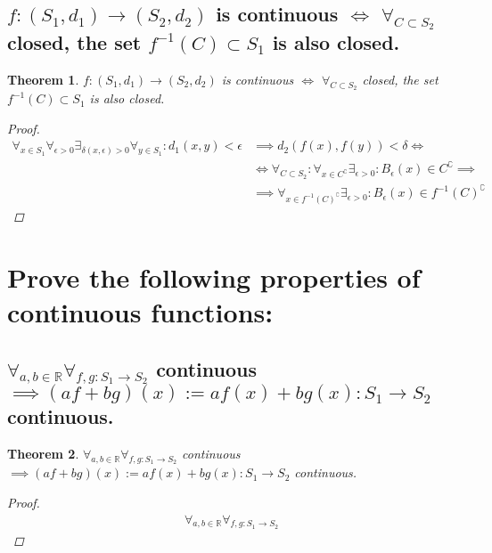 \documentclass[]{article}
\newcommand{\R}{\mathbb{R}}
\newtheorem{theorem}{Theorem}
\begin{document}
\subsection{$f: (S_1,d_1) \to (S_2,d_2)$ is continuous $\iff$ $\forall_{C \subset S_2}$ closed, the set $f^{-1} (C) \subset S_1$ is also closed.}
\begin{theorem}
    $f: (S_1,d_1) \to (S_2,d_2)$ is continuous $\iff$ $\forall_{C \subset S_2}$ closed, the set $f^{-1} (C) \subset S_1$ is also closed.
    \begin{proof}
        \begin{align*}
            \forall_{x\in S_1} \forall_{\epsilon>0} \exists_{\delta(x,\epsilon)>0} \forall_{y\in S_1} : d_1(x,y) < \epsilon &\implies d_2(f(x),f(y)) < \delta \iff\\
            &\iff \forall_{C\subset S_2} : \forall_{x \in C^\complement} \exists_{\epsilon>0} : B_{\epsilon}(x) \in C^\complement \implies\\
            &\implies \forall_{x \in f^{-1}(C)^\complement} \exists_{\epsilon>0} : B_{\epsilon}(x) \in f^{-1}(C)^\complement
        \end{align*}
    \end{proof}
\end{theorem}













\newpage
\section{Prove the following properties of continuous functions:}

\subsection{$\forall_{a,b\in\R} \forall_{f,g : S_1 \to S_2}$ continuous $\implies (a f + b g) (x) := a f(x) + b g(x) : S_1 \to S_2$ continuous.}
\begin{theorem}
    $\forall_{a,b\in\R} \forall_{f,g : S_1 \to S_2}$ continuous $\implies (a f + b g) (x) := a f(x) + b g(x) : S_1 \to S_2$ continuous.
    \begin{proof}
        \begin{align*}
            \forall_{a,b\in\R} \forall_{f,g : S_1 \to S_2} 
        \end{align*}
    \end{proof}
\end{theorem}
\end{document}
